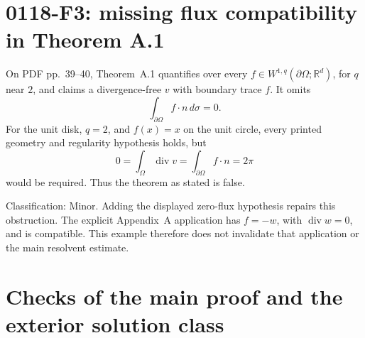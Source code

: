 \documentclass[10pt]{article}
\begin{document}
\section*{0118-F3: missing flux compatibility in Theorem A.1}
On PDF pp. 39–40, Theorem A.1 quantifies over every \(f\in W^{1,q}(\partial\Omega;\mathbb R^d)\), for \(q\) near \(2\), and claims a divergence-free \(v\) with boundary trace \(f\). It omits \[\int_{\partial\Omega} f\cdot n\,d\sigma=0.\] For the unit disk, \(q=2\), and \(f(x)=x\) on the unit circle, every printed geometry and regularity hypothesis holds, but \[0=\int_\Omega\operatorname{div}v
   =\int_{\partial\Omega}f\cdot n=2\pi\] would be required. Thus the theorem as stated is false.\par
Classification: Minor. Adding the displayed zero-flux hypothesis repairs this obstruction. The explicit Appendix A application has \(f=-w\), with \(\operatorname{div}w=0\), and is compatible. This example therefore does not invalidate that application or the main resolvent estimate.\par
\section*{Checks of the main proof and the exterior solution class}
\end{document}

